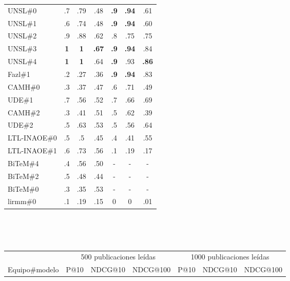 \begin{itemize}
\begin{table}[t!]
\begin{tabular}{l c c c|c c c}
UNSL\#0 & .7 & .79 & .48 & \textbf{.9} & \textbf{.94} & .61 \\
UNSL\#1 & .6 & .74 & .48 & \textbf{.9} & \textbf{.94} & .60 \\
UNSL\#2 & .9 & .88 & .62 & .8 & .75 & .75 \\
UNSL\#3 & \textbf{1} & \textbf{1} & \textbf{.67} & \textbf{.9} & \textbf{.94} & .84 \\
UNSL\#4 & \textbf{1} & \textbf{1} & .64 & \textbf{.9} & .93 & \textbf{.86} \\
\hline\hline
Fazl\#1 & .2 & .27 & .36 & \textbf{.9} & \textbf{.94} & .83 \\
CAMH\#0 & .3 & .37 & .47 & .6 & .71 & .49 \\
UDE\#1 & .7 & .56 & .52 & .7 & .66 & .69 \\
CAMH\#2 & .3 & .41 & .51 & .5 & .62 & .39 \\
UDE\#2 & .5 & .63 & .53 & .5 & .56 & .64 \\
LTL-INAOE\#0 & .5 & .5 & .45 & .4 & .41 & .55 \\
LTL-INAOE\#1 & .6 & .73 & .56 & .1 & .19 & .17 \\
BiTeM\#4 & .4 & .56 & .50 & - & - & - \\
BiTeM\#2 & .5 & .48 & .44 & - & - & - \\
BiTeM\#0 & .3 & .35 & .53 & - & - & - \\
lirmm\#0 & .1 & .19 & .15 & 0 & 0 & .01 \\


\hline
\hline
\end{tabular}

\

\

\begin{tabular}{l c c c|c c c}
\hline
& \multicolumn{3}{c}{500 publicaciones leídas} & \multicolumn{3}{c}{1000 publicaciones leídas} \\
Equipo\#modelo & P@10 & NDCG@10 & NDCG@100 &  P@10 & NDCG@10 & NDCG@100 \\ \hline


\end{tabular}
\end{table}
\end{itemize}

